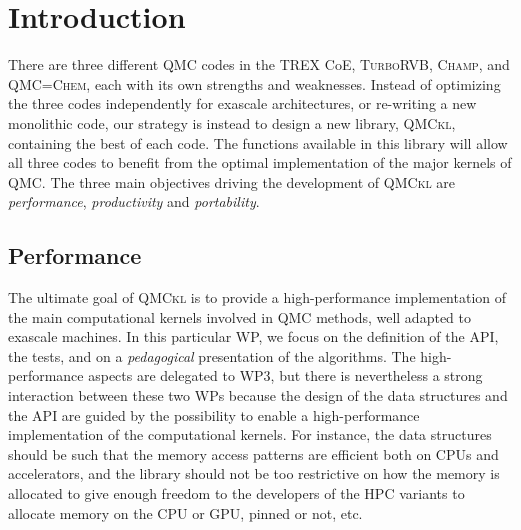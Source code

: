 \newcommand{\orgmode}{\texttt{org-mode}}
\newcommand{\Makefile}{\texttt{Makefile}}
\newcommand{\context}{\texttt{context}}
\newcommand{\CC}{C\nolinebreak\hspace{-.05em}\raisebox{.4ex}{\tiny\bf +}\nolinebreak\hspace{-.10em}\raisebox{.4ex}{\tiny\bf +}}
\def\CC{{C\nolinebreak[4]\hspace{-.05em}\raisebox{.4ex}{\tiny\bf ++}}}
\newcommand{\qmcchem}{\textsc{QMC=Chem}}
\newcommand{\champ}{\textsc{Champ}}
\newcommand{\turbo}{\textsc{TurboRVB}}
\newcommand{\QMCkl}{\textsc{\ac{QMCkl}}}

\section{Introduction}

There are three different \ac{QMC} codes in the \ac{TREX} \ac{CoE},
\turbo{}, \champ{}, and \qmcchem{}, each with its own strengths and
weaknesses. Instead of optimizing the three codes independently for
exascale architectures, or re-writing a new monolithic code, our
strategy is instead to design a new library, \QMCkl{}, containing
the best of each code. The functions available in this library will
allow all three codes to benefit from the optimal implementation of
the major kernels of \ac{QMC}.
The three main objectives driving the development of \QMCkl{} are
\emph{performance}, \emph{productivity} and \emph{portability}.

\subsection{Performance}

The ultimate goal of \QMCkl{} is to provide a high-performance
implementation of the main computational kernels involved in \ac{QMC}
methods, well adapted to exascale machines.
In this particular \ac{WP}, we focus on the
definition of the \ac{API}, the tests, and on a \emph{pedagogical}
presentation of the algorithms. The high-performance aspects are
delegated to \ac{WP}3, but there is nevertheless a strong interaction
between these two \acp{WP} because the design of the data structures
and the \ac{API} are guided by the possibility to enable a
high-performance implementation of the computational kernels.
For instance, the data structures should be such that the memory
access patterns are efficient both on CPUs and accelerators, and the
library should not be too restrictive on how the memory is allocated
to give enough freedom to the developers of the \ac{HPC} variants to
allocate memory on the CPU or \ac{GPU}, pinned or not, etc.

